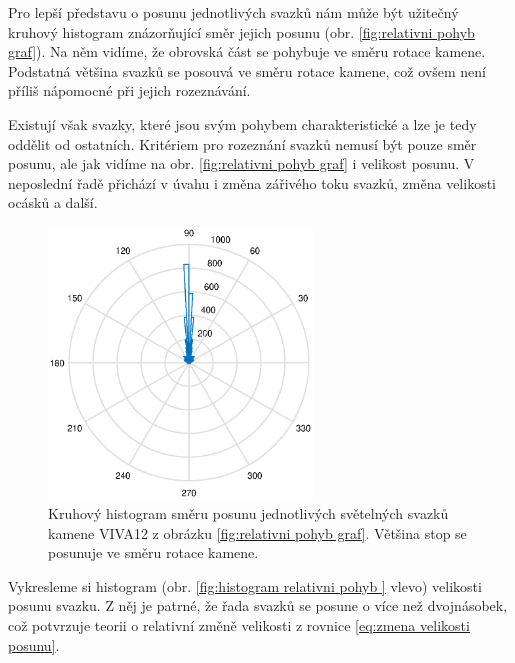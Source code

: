 \newpage
Pro lepší představu o posunu jednotlivých svazků nám může být užitečný kruhový histogram znázorňující směr jejich posunu (obr. \ref{fig:relativni pohyb graf}). Na něm vidíme, že obrovská část se pohybuje ve směru rotace kamene. Podstatná většina svazků se posouvá ve směru rotace kamene, což ovšem není příliš nápomocné při jejich rozeznávání.

Existují však svazky, které jsou svým pohybem charakteristické a lze je tedy oddělit od ostatních. Kritériem pro rozeznání svazků nemusí být pouze směr posunu, ale jak vidíme na obr. \ref{fig:relativni pohyb graf} i velikost posunu. V neposlední řadě přichází v úvahu i změna zářivého toku svazků, změna velikosti ocásků a další. 

\begin{figure}[h!]
\begin{center}
\includegraphics[width = 7cm]{figures/kruhovy_histogram.eps}
\end{center}
\caption{Kruhový histogram směru posunu jednotlivých světelných svazků kamene VIVA12 z obrázku \ref{fig:relativni pohyb graf}. Většina stop se posunuje ve směru rotace kamene.}
\label{fig:kruhovy histogram}
\end{figure}

Vykresleme si histogram (obr. \ref{fig:histogram relativni pohyb } vlevo) velikosti posunu svazku. Z něj je patrné, že řada svazků se posune o více než dvojnásobek, což potvrzuje teorii o relativní změně velikosti z rovnice \ref{eq:zmena velikosti posunu}. 

